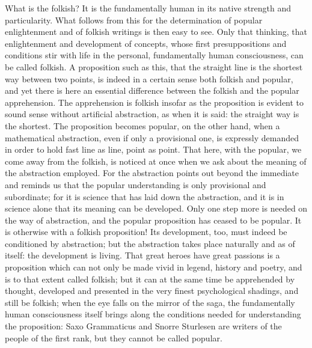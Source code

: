 \documentclass[12pt]{book}
\newcommand{\opage}[1]{\marginnote{\footnotesize\textit{[#1]}}}
\begin{document}
What is the folkish? It is the fundamentally human in its native
strength and particularity. What follows from this for the determination
of popular enlightenment and of folkish writings is then easy to see.
Only that thinking, that enlightenment and development of concepts, whose
first presuppositions and conditions stir with life in the personal,
fundamentally human consciousness, can be called folkish. A proposition
such as this, that the straight line is the shortest way between two
points, is indeed in a certain sense both folkish and popular, and yet
there is here an essential difference between the folkish and the
popular apprehension. The apprehension is folkish insofar as the
proposition is evident to sound sense without artificial abstraction, as
when it is said: the straight way is the shortest. The proposition
becomes popular, on the other hand, when a mathematical abstraction,
even if only a provisional one, is expressly demanded in order to hold
fast line as line, point as point. That here, with the popular, we come
away from the folkish, is noticed at once when we ask about the meaning
of the abstraction employed. For the abstraction points out beyond the
immediate and reminds us that the popular understanding is only
provisional and subordinate; for it is science that has laid down the
abstraction, and it is in science alone that its meaning can be
developed. Only one step more is needed on the way of abstraction, and
the popular proposition has ceased to be popular. It is otherwise with a
folkish proposition! Its development, too, must indeed be conditioned by
abstraction; but the abstraction
\opage{122}\setcounter{footnote}{0}%
takes place naturally and as of itself: the development is living. That
great heroes have great passions is a proposition which can not only be
made vivid in legend, history and poetry, and is to that extent called
folkish; but it can at the same time be apprehended by thought,
developed and presented in the very finest psychological shadings, and
still be folkish; when the eye falls on the mirror of the saga, the
fundamentally human consciousness itself brings along the conditions
needed for understanding the proposition: Saxo Grammaticus and Snorre
Sturlesen are writers of the people of the first rank, but they cannot be
called popular.
\end{document}
